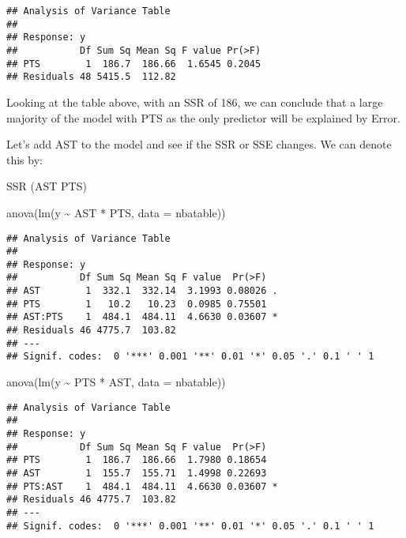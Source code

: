 \documentclass[
]{article}
\newenvironment{Shaded}{\begin{snugshade}}{\end{snugshade}}
\newcommand{\AttributeTok}[1]{\textcolor[rgb]{0.77,0.63,0.00}{#1}}
\newcommand{\FunctionTok}[1]{\textcolor[rgb]{0.00,0.00,0.00}{#1}}
\newcommand{\NormalTok}[1]{#1}
\newcommand{\SpecialCharTok}[1]{\textcolor[rgb]{0.00,0.00,0.00}{#1}}
\begin{document}
\begin{verbatim}
## Analysis of Variance Table
## 
## Response: y
##           Df Sum Sq Mean Sq F value Pr(>F)
## PTS        1  186.7  186.66  1.6545 0.2045
## Residuals 48 5415.5  112.82
\end{verbatim}

Looking at the table above, with an SSR of 186, we can conclude that a
large majority of the model with PTS as the only predictor will be
explained by Error.

Let's add AST to the model and see if the SSR or SSE changes. We can
denote this by:

SSR (AST \textbar{} PTS)

\begin{Shaded}
\begin{Highlighting}[]
\FunctionTok{anova}\NormalTok{(}\FunctionTok{lm}\NormalTok{(y }\SpecialCharTok{\textasciitilde{}}\NormalTok{ AST }\SpecialCharTok{*}\NormalTok{ PTS, }\AttributeTok{data =}\NormalTok{ nbatable))}
\end{Highlighting}
\end{Shaded}

\begin{verbatim}
## Analysis of Variance Table
## 
## Response: y
##           Df Sum Sq Mean Sq F value  Pr(>F)  
## AST        1  332.1  332.14  3.1993 0.08026 .
## PTS        1   10.2   10.23  0.0985 0.75501  
## AST:PTS    1  484.1  484.11  4.6630 0.03607 *
## Residuals 46 4775.7  103.82                  
## ---
## Signif. codes:  0 '***' 0.001 '**' 0.01 '*' 0.05 '.' 0.1 ' ' 1
\end{verbatim}

\begin{Shaded}
\begin{Highlighting}[]
\FunctionTok{anova}\NormalTok{(}\FunctionTok{lm}\NormalTok{(y }\SpecialCharTok{\textasciitilde{}}\NormalTok{ PTS }\SpecialCharTok{*}\NormalTok{ AST, }\AttributeTok{data =}\NormalTok{ nbatable))}
\end{Highlighting}
\end{Shaded}

\begin{verbatim}
## Analysis of Variance Table
## 
## Response: y
##           Df Sum Sq Mean Sq F value  Pr(>F)  
## PTS        1  186.7  186.66  1.7980 0.18654  
## AST        1  155.7  155.71  1.4998 0.22693  
## PTS:AST    1  484.1  484.11  4.6630 0.03607 *
## Residuals 46 4775.7  103.82                  
## ---
## Signif. codes:  0 '***' 0.001 '**' 0.01 '*' 0.05 '.' 0.1 ' ' 1
\end{verbatim}
\end{document}
